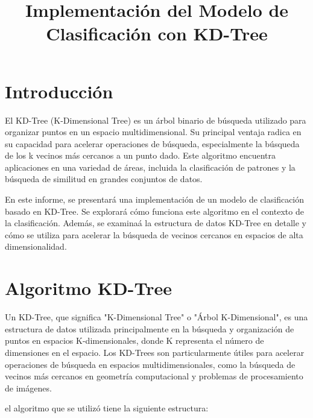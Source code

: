 \documentclass[]{article}
\title{Implementación del Modelo de Clasificación con KD-Tree}
\author{}
\begin{document}
\maketitle
\section{Introducción}
El KD-Tree (K-Dimensional Tree) es un árbol binario de búsqueda utilizado para organizar puntos en un espacio multidimensional. Su principal ventaja radica en su capacidad para acelerar operaciones de búsqueda, especialmente la búsqueda de los k vecinos más cercanos a un punto dado. Este algoritmo encuentra aplicaciones en una variedad de áreas, incluida la clasificación de patrones y la búsqueda de similitud en grandes conjuntos de datos.

En este informe, se presentará una implementación de un modelo de clasificación basado en KD-Tree. Se explorará cómo funciona este algoritmo en el contexto de la clasificación. Además, se examinaá la estructura de datos KD-Tree en detalle y cómo se utiliza para acelerar la búsqueda de vecinos cercanos en espacios de alta dimensionalidad.

\section{Algoritmo KD-Tree}
Un KD-Tree, que significa "K-Dimensional Tree" o "Árbol K-Dimensional", es una estructura de datos utilizada principalmente en la búsqueda y organización de puntos en espacios K-dimensionales, donde K representa el número de dimensiones en el espacio. Los KD-Trees son particularmente útiles para acelerar operaciones de búsqueda en espacios multidimensionales, como la búsqueda de vecinos más cercanos en geometría computacional y problemas de procesamiento de imágenes.

el algoritmo que se utilizó tiene la siguiente estructura:
\end{document}
